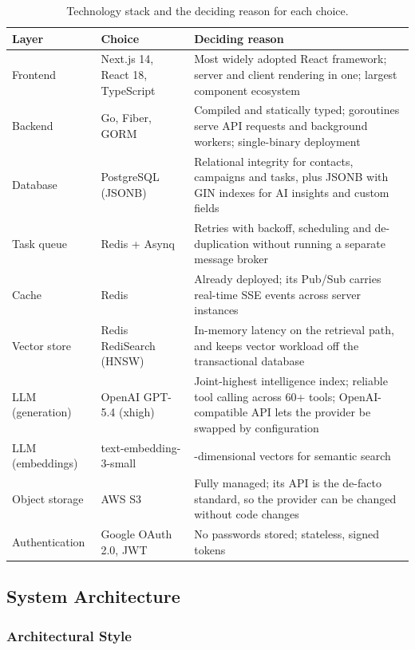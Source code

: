 \documentclass[a4paper]{article}
\begin{document}
\begin{table}[H]
\centering
\caption{Technology stack and the deciding reason for each choice.}
\label{tab:stack-summary}
\small
\begin{tabularx}{\textwidth}{>{\raggedright\arraybackslash}p{2.4cm} >{\raggedright\arraybackslash}p{3.8cm} >{\raggedright\arraybackslash}X}
\toprule
\textbf{Layer} & \textbf{Choice} & \textbf{Deciding reason} \\
\midrule
Frontend & Next.js 14, React 18, TypeScript & Most widely adopted React framework; server and client rendering in one; largest component ecosystem \\
Backend & Go, Fiber, GORM & Compiled and statically typed; goroutines serve API requests and background workers; single-binary deployment \\
Database & PostgreSQL (JSONB) & Relational integrity for contacts, campaigns and tasks, plus JSONB with GIN indexes for AI insights and custom fields \\
Task queue & Redis + Asynq & Retries with backoff, scheduling and de-duplication without running a separate message broker \\
Cache & Redis & Already deployed; its Pub/Sub carries real-time SSE events across server instances \\
Vector store & Redis RediSearch (HNSW) & In-memory latency on the retrieval path, and keeps vector workload off the transactional database \\
LLM (generation) & OpenAI GPT-5.4 (xhigh) & Joint-highest intelligence index; reliable tool calling across 60+ tools; OpenAI-compatible API lets the provider be swapped by configuration \\
LLM (embeddings) & text-embedding-3-small & 1536-dimensional vectors for semantic search \\
Object storage & AWS S3 & Fully managed; its API is the de-facto standard, so the provider can be changed without code changes \\
Authentication & Google OAuth 2.0, JWT & No passwords stored; stateless, signed tokens \\
\bottomrule
\end{tabularx}
\end{table}

\subsection{System Architecture}

\subsubsection{Architectural Style}
\end{document}

